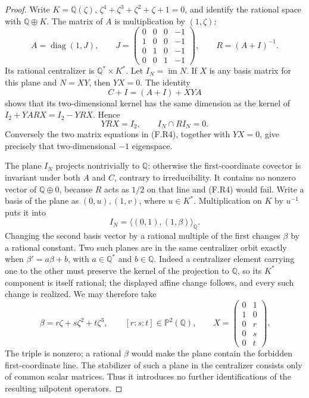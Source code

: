 \begin{proof}
Write $K=\mathbb Q(\zeta)$, $\zeta^4+\zeta^3+\zeta^2+
\zeta+1=0$, and identify the rational space with
$\mathbb Q\oplus K$.  The matrix of $A$ is multiplication by
$(1,\zeta)$:
\[
 A=\operatorname{diag}(1,J),\qquad
 J=\begin{pmatrix}
 0&0&0&-1\\1&0&0&-1\\0&1&0&-1\\0&0&1&-1
 \end{pmatrix},\qquad R=(A+I)^{-1}.
 \tag{F.R3}
\]
Its rational centralizer is $\mathbb Q^*\times K^*$.
Let $I_N=\operatorname{im}N$.  If $X$ is any basis matrix
for this plane and $N=XY$, then $YX=0$.
The identity
\[
 C+I=(A+I)+XYA
\]
shows that its two-dimensional kernel has the same dimension
as the kernel of
$I_2+YARX=I_2-YRX$.  Hence
\[
 YRX=I_2,
 \qquad I_N\cap RI_N=0.
 \tag{F.R4}
\]
Conversely the two matrix equations in (F.R4), together with
$YX=0$, give precisely that two-dimensional $-1$ eigenspace.

The plane $I_N$ projects nontrivially to $\mathbb Q$:
otherwise the first-coordinate covector is invariant under
both $A$ and $C$, contrary to irreducibility.
It contains no nonzero vector of $\mathbb Q\oplus0$,
because $R$ acts as $1/2$ on that line and (F.R4) would fail.
Write a basis of the plane as $(0,u),(1,v)$, where
$u\in K^*$.  Multiplication on $K$ by $u^{-1}$ puts it into
\[
 I_N=\langle(0,1),(1,\beta)\rangle_{\mathbb Q}.
\]
Changing the second basis vector by a rational multiple of
the first changes $\beta$ by a rational constant.
Two such planes are in the same centralizer orbit exactly
when $\beta'=a\beta+b$, with $a\in\mathbb Q^*$ and
$b\in\mathbb Q$.  Indeed a centralizer element carrying
one to the other must preserve the kernel of the projection
to $\mathbb Q$, so its $K^*$ component is itself rational;
the displayed affine change follows, and every such change
is realized.  We may therefore take
\[
 \beta=r\zeta+s\zeta^2+t\zeta^3,
 \qquad [r:s:t]\in\mathbb P^2(\mathbb Q),
 \qquad
 X=\begin{pmatrix}0&1\\1&0\\0&r\\0&s\\0&t\end{pmatrix}.
 \tag{F.R5}
\]
The triple is nonzero; a rational $\beta$ would make the
plane contain the forbidden first-coordinate line.
The stabilizer of such a plane in the centralizer consists
only of common scalar matrices.  Thus it introduces no
further identifications of the resulting nilpotent operators.


\end{proof}
